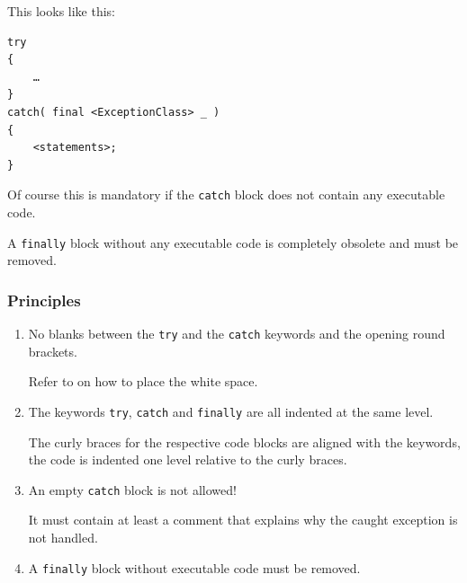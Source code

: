 This looks like this:
\begin{lstlisting}
try
{
    …
}
catch( final <ExceptionClass> _ )
{
    <statements>;
}
\end{lstlisting}
Of course this is mandatory if the \lstinline|catch| block does not contain any executable code.

A \lstinline|finally| block without any executable code is completely obsolete and must be removed.

\subsubsection{Principles}
\begin{enumerate}[label=P\arabic*.]
\item{No blanks between the \lstinline|try| and the \lstinline|catch| keywords and the opening round brackets.

Refer to  on how to place the white space.}
\item{The keywords \lstinline|try|, \lstinline|catch| and \lstinline|finally| are all indented at the same level.

The curly braces  for the respective code blocks are aligned with the keywords, the code is indented one level relative to the curly braces.}
\item{An empty \lstinline|catch| block is not allowed!

It must contain at least a comment that explains why the caught exception is not handled.}
\item{A \lstinline|finally| block without executable code must be removed.}
\end{enumerate}

